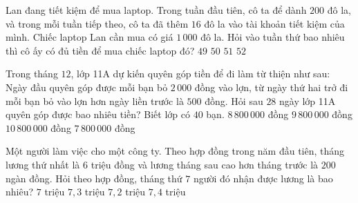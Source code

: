 \begin{ex}%
	Lan đang tiết kiệm để mua laptop. Trong tuần đầu tiên, cô ta  để dành $200$ đô la, và trong mỗi tuần tiếp theo, cô ta đã thêm $16$ đô la vào tài khoản tiết kiệm của mình. Chiếc laptop Lan cần mua có giá $1\,000$ đô la. Hỏi vào tuần thứ bao nhiêu thì cô ấy có đủ tiền để mua chiếc laptop đó?
	 \choice
		 {$49$}
		 {$50$}
		 {\True $51$}
		{$52$} 
\end{ex}

\begin{ex}%
	Trong tháng $12$, lớp 11A dự kiến quyên góp tiền để đi làm từ thiện như sau: Ngày đầu quyên góp được mỗi bạn bỏ $2\,000$ đồng vào lợn, từ ngày thứ hai trở đi mỗi  bạn bỏ vào lợn hơn ngày liền trước là $500$ đồng. Hỏi sau $28$ ngày lớp 11A quyên góp được bao nhiêu tiền? Biết lớp có $40$ bạn.
	 \choice
		{$8\,800\,000$ đồng} 
		{\True  $9\,800\,000$ đồng}
		{$10\,800\,000$  đồng}
		{$7\,800\,000$  đồng}
\end{ex}

\begin{ex}%
	Một người làm việc cho một công ty. Theo hợp đồng trong năm đầu tiên, tháng lương thứ nhất là $6$ triệu đồng và lương tháng sau cao hơn tháng trước là $200$ ngàn đồng. Hỏi theo hợp đồng, tháng thứ $7$ người đó nhận được lương là bao  nhiêu?
	\choice 
		{$7$ triệu} 
		{$7{,}3$ triệu} 
		{\True $7{,}2$ triệu} 
		{$7{,}4$  triệu}
\end{ex}

